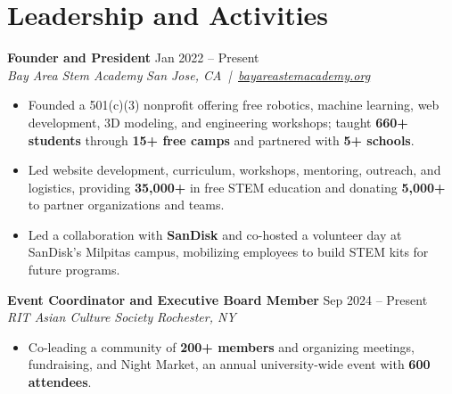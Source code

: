 \documentclass[10pt,letterpaper]{article}
\newcommand{\resumeRole}[4]{%
  \textbf{#1} \hfill #2\\
  \textit{#3} \hfill \textit{#4}
}
\begin{document}
\section*{Leadership and Activities}
\resumeRole{Founder and President}{Jan 2022 -- Present}{Bay Area Stem Academy}{San Jose, CA \,|\, \href{https://bayareastemacademy.org}{bayareastemacademy.org}}
\begin{itemize}
  \item Founded a 501(c)(3) nonprofit offering free robotics, machine learning, web development, 3D modeling, and engineering workshops; taught \textbf{660+ students} through \textbf{15+ free camps} and partnered with \textbf{5+ schools}.
  \item Led website development, curriculum, workshops, mentoring, outreach, and logistics, providing \textbf{\textdollar{}35,000+} in free STEM education and donating \textbf{\textdollar{}5,000+} to partner organizations and teams.
  \item Led a collaboration with \textbf{SanDisk} and co-hosted a volunteer day at SanDisk's Milpitas campus, mobilizing employees to build STEM kits for future programs.
\end{itemize}

\resumeRole{Event Coordinator and Executive Board Member}{Sep 2024 -- Present}{RIT Asian Culture Society}{Rochester, NY}
\begin{itemize}
  \item Co-leading a community of \textbf{200+ members} and organizing meetings, fundraising, and Night Market, an annual university-wide event with \textbf{600 attendees}.
\end{itemize}
\end{document}
